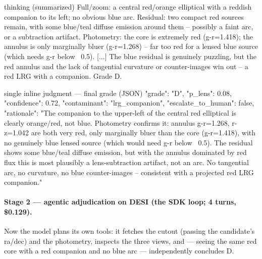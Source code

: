\documentclass[11pt,letterpaper]{article}
\begin{document}
\begin{toolio}{thinking (summarized)}
Full/zoom: a central red/orange elliptical with a reddish companion to its left; no obvious blue arc.
Residual: two compact red sources remain, with some blue/teal diffuse emission around them -- possibly
a faint arc, or a subtraction artifact. Photometry: the core is extremely red (g-r=1.418); the annulus
is only marginally bluer (g-r=1.268) -- far too red for a lensed blue source (which needs g-r below
~0.5). [...] The blue residual is genuinely puzzling, but the red annulus and the lack of tangential
curvature or counter-images win out -- a red LRG with a companion. Grade D.
\end{toolio}

\begin{toolio}{single inline judgment --- final grade (JSON)}
{"grade": "D", "p_lens": 0.08, "confidence": 0.72, "contaminant": "lrg_companion",
 "escalate_to_human": false,
 "rationale": "The companion to the upper-left of the central red elliptical is clearly orange/red,
 not blue. Photometry confirms it: annulus g-r=1.268, r-z=1.042 are both very red, only marginally
 bluer than the core (g-r=1.418), with no genuinely blue lensed source (which would need g-r below
 ~0.5). The residual shows some blue/teal diffuse emission, but with the annulus dominated by red flux
 this is most plausibly a lens-subtraction artifact, not an arc. No tangential arc, no curvature, no
 blue counter-images -- consistent with a projected red LRG companion."}
\end{toolio}

\paragraph{Stage 2 --- agentic adjudication on DESI (the SDK loop; 4 turns, \$0.129).} Now the model
plans its own tools: it fetches the cutout (passing the candidate's ra/dec) and the photometry,
inspects the three views, and --- seeing the same red core with a red companion and no blue arc ---
independently concludes D.
\end{document}
